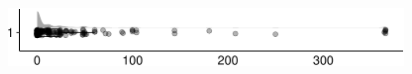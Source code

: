 \documentclass[
]{article}
\begin{document}
\begin{minipage}[t]{0.3\linewidth}

~

\end{minipage}%
\begin{minipage}[t]{0.7\linewidth}

\includegraphics[width=396px]{codebook_template_files/figure-latex/q7_28_rainplot-1}

\end{minipage}
 \vspace*{-5mm} 

\begin{minipage}[t]{0.3\linewidth}

~

\end{minipage}%
\begin{minipage}[t]{0.7\linewidth}

~

\end{minipage}
 \vspace*{-7mm} 
\end{document}
